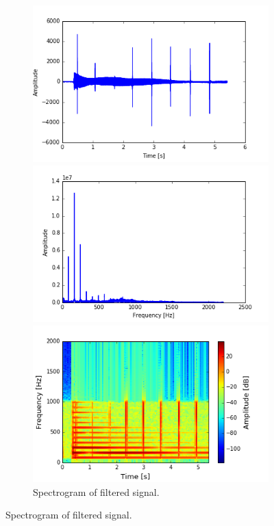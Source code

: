\begin{figure}[H]
\centering
\begin{subfigure}{0.49\textwidth}
\centering
\includegraphics[width=\textwidth]{figures/validation/integration/signal.png}
\caption{Input signal.}
\label{fig:inte_signal}

\includegraphics[width=\textwidth]{figures/validation/integration/FSIGNAL.png}
\caption{Frequency spectrum of signal.}
\label{fig:inte_SIGNAL}

\includegraphics[width=\textwidth]{figures/validation/integration/spectrogram.png}
\caption{Spectrogram of filtered signal.}
\label{fig:inte_spec}


\end{subfigure}
\end{figure}
